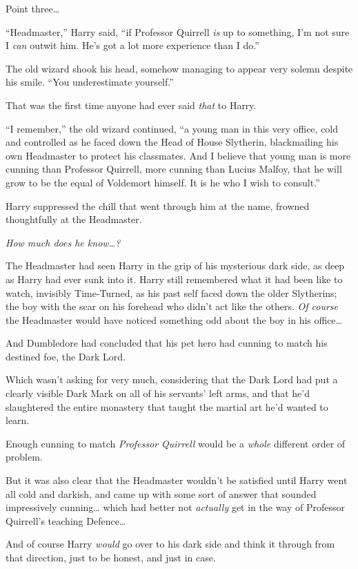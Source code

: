 Point three\ldots{}

``Headmaster,'' Harry said, ``if Professor Quirrell \emph{is} up to
something, I'm not sure I \emph{can} outwit him. He's got a lot more
experience than I do.''

The old wizard shook his head, somehow managing to appear very solemn
despite his smile. ``You underestimate yourself.''

That was the first time anyone had ever said \emph{that} to Harry.

``I remember,'' the old wizard continued, ``a young man in this very
office, cold and controlled as he faced down the Head of House
Slytherin, blackmailing his own Headmaster to protect his classmates.
And I believe that young man is more cunning than Professor Quirrell,
more cunning than Lucius Malfoy, that he will grow to be the equal of
Voldemort himself. It is he who I wish to consult.''

Harry suppressed the chill that went through him at the name, frowned
thoughtfully at the Headmaster.

\emph{How much does he know\ldots{}?}

The Headmaster had seen Harry in the grip of his mysterious dark side,
as deep as Harry had ever sunk into it. Harry still remembered what it
had been like to watch, invisibly Time-Turned, as his past self faced
down the older Slytherins; the boy with the scar on his forehead who
didn't act like the others. \emph{Of course} the Headmaster would have
noticed something odd about the boy in his office\ldots{}

And Dumbledore had concluded that his pet hero had cunning to match his
destined foe, the Dark Lord.

Which wasn't asking for very much, considering that the Dark Lord had
put a clearly visible Dark Mark on all of his servants' left arms, and
that he'd slaughtered the entire monastery that taught the martial art
he'd wanted to learn.

Enough cunning to match \emph{Professor Quirrell} would be a
\emph{whole} different order of problem.

But it was also clear that the Headmaster wouldn't be satisfied until
Harry went all cold and darkish, and came up with some sort of answer
that sounded impressively cunning\ldots{} which had better not
\emph{actually} get in the way of Professor Quirrell's teaching
Defence\ldots{}

And of course Harry \emph{would} go over to his dark side and think it
through from that direction, just to be honest, and just in case.

